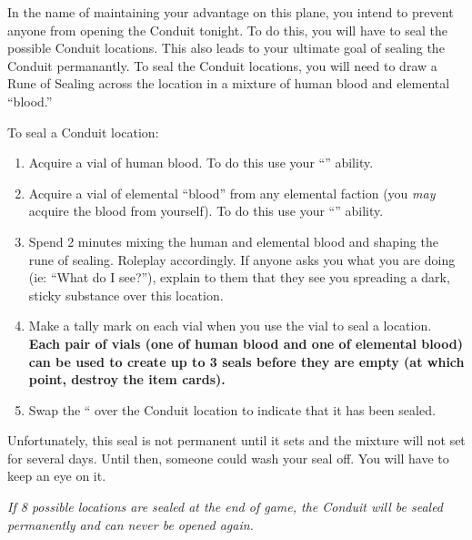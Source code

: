 \documentclass[green]{elementals}
\begin{document}
\name{\gSealingLocations{}}

In the name of maintaining your advantage on this plane, you intend to prevent anyone from opening the Conduit tonight.  To do this, you will have to seal the possible Conduit locations. This also leads to your ultimate goal of sealing the Conduit permanantly. To seal the Conduit locations, you will need to draw a Rune of Sealing across the location in a mixture of human blood and elemental ``blood.''

To seal a Conduit location:
\begin{enumerate}
  \item Acquire a vial of human blood. To do this use your ``\aDrawBlood{}'' ability.
  \item Acquire a vial of elemental ``blood'' from any elemental faction (you \emph{may} acquire the blood from yourself). To do this use your ``\aDrawBlood{}'' ability.
  \item Spend 2 minutes mixing the human and elemental blood and shaping the rune of sealing. Roleplay accordingly.  If anyone asks you what you are doing (ie: ``What do I see?''), explain to them that they see you spreading a dark, sticky substance over this location.
  \item Make a tally mark on each vial when you use the vial to seal a location. {\bf Each pair of vials (one of human blood and one of elemental blood) can be used to create up to 3 seals before they are empty (at which point, destroy the item cards).}
  \item Swap the `` over the Conduit location to indicate that it has been sealed.
\end{enumerate}

Unfortunately, this seal is not permanent until it sets and the mixture will not set for several days. Until then, someone could wash your seal off. You will have to keep an eye on it.

{\large \emph{If 8 possible locations are sealed at the end of game, the Conduit will be sealed permanently and can never be opened again.}}
\end{document}
